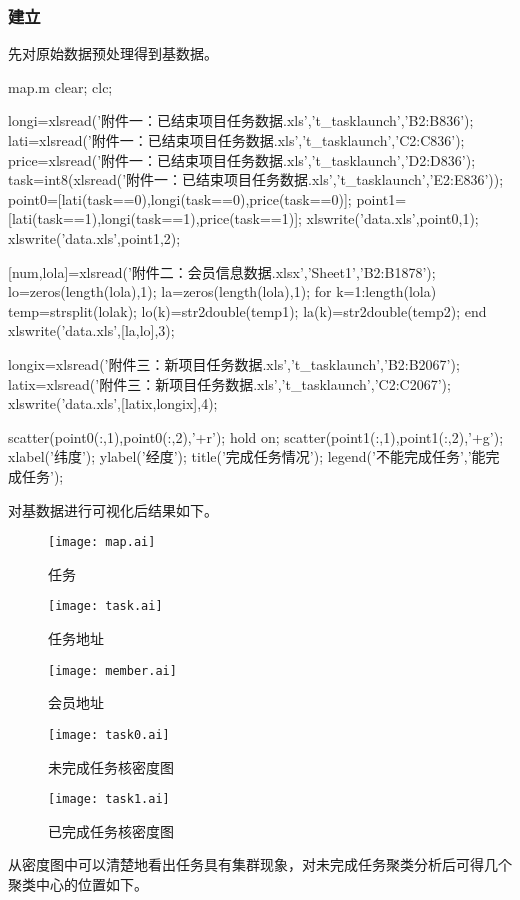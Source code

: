 \documentclass{article}
\begin{document}
\subsubsection{建立}
先对原始数据预处理得到基数据。
\begin{matlab}{map.m}
clear;
clc;

longi=xlsread('附件一：已结束项目任务数据.xls','t_tasklaunch','B2:B836');
lati=xlsread('附件一：已结束项目任务数据.xls','t_tasklaunch','C2:C836');
price=xlsread('附件一：已结束项目任务数据.xls','t_tasklaunch','D2:D836');
task=int8(xlsread('附件一：已结束项目任务数据.xls','t_tasklaunch','E2:E836'));
point0=[lati(task==0),longi(task==0),price(task==0)];
point1=[lati(task==1),longi(task==1),price(task==1)];
xlswrite('data.xls',point0,1);
xlswrite('data.xls',point1,2);

[num,lola]=xlsread('附件二：会员信息数据.xlsx','Sheet1','B2:B1878');
lo=zeros(length(lola),1);
la=zeros(length(lola),1);
for k=1:length(lola)
	temp=strsplit(lola{k});
	lo(k)=str2double(temp{1});
	la(k)=str2double(temp{2});
end
xlswrite('data.xls',[la,lo],3);

longix=xlsread('附件三：新项目任务数据.xls','t_tasklaunch','B2:B2067');
latix=xlsread('附件三：新项目任务数据.xls','t_tasklaunch','C2:C2067');
xlswrite('data.xls',[latix,longix],4);

scatter(point0(:,1),point0(:,2),'+r');
hold on;
scatter(point1(:,1),point1(:,2),'+g');
xlabel('纬度');
ylabel('经度');
title('完成任务情况');
legend('不能完成任务','能完成任务');
\end{matlab}
\par\indent 对基数据进行可视化后结果如下。
\begin{figure}[htbp]
	\centering
	\caption{任务}
	\texttt{[image: map.ai]}
\end{figure}
\begin{figure}[htbp]
	\centering
	\caption{任务地址}
	\texttt{[image: task.ai]}
\end{figure}
\begin{figure}[htbp]
	\centering
	\caption{会员地址}
	\texttt{[image: member.ai]}
\end{figure}
\begin{figure}[htbp]
	\centering
	\caption{未完成任务核密度图}
	\texttt{[image: task0.ai]}
\end{figure}
\begin{figure}[htbp]
	\centering
	\caption{已完成任务核密度图}
	\texttt{[image: task1.ai]}
\end{figure}
\newpage 从密度图中可以清楚地看出任务具有集群现象，对未完成任务聚类分析后可得几个聚类中心的位置如下。
\end{document}
